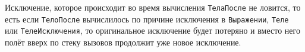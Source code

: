 
Исключение, которое происходит во время вычисления \texttt{ТелаПосле} не ловится,
то есть если \texttt{ТелоПосле} вычислилось по причине исключения в 
\texttt{Выражении}, \texttt{Теле} или \texttt{ТелеИсключения}, то оригинальное
исключение будет потеряно и вместо него полёт вверх по стеку вызовов продолжит уже
новое исключение.

